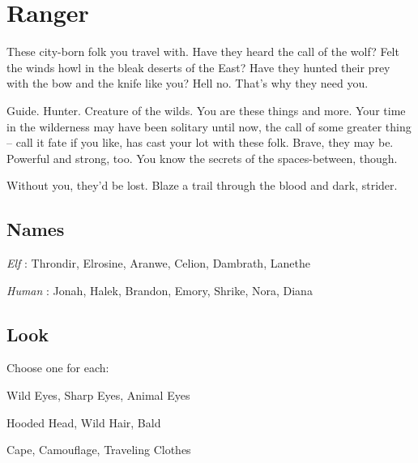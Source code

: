\chapter{Ranger}
  
            

         

These city-born folk you travel with. Have they heard the call of the wolf? Felt the winds howl in the bleak deserts of the East? Have they hunted their prey with the bow and the knife like you? Hell no. That’s why they need you.

         

Guide. Hunter. Creature of the wilds. You are these things and more. Your time in the wilderness may have been solitary until now, the call of some greater thing – call it fate if you like, has cast your lot with these folk. Brave, they may be. Powerful and strong, too. You know the secrets of the spaces-between, though.

         

Without you, they’d be lost. Blaze a trail through the blood and dark, strider.

       

       
\section{Names}   
       

         

           {\em Elf} : Throndir, Elrosine, Aranwe, Celion, Dambrath, Lanethe

         

           {\em Human} : Jonah, Halek, Brandon, Emory, Shrike, Nora, Diana

       

       
\section{Look}  
       

         

Choose one for each:

         

Wild Eyes, Sharp Eyes, Animal Eyes

         

Hooded Head, Wild Hair, Bald

         

Cape, Camouflage, Traveling Clothes

